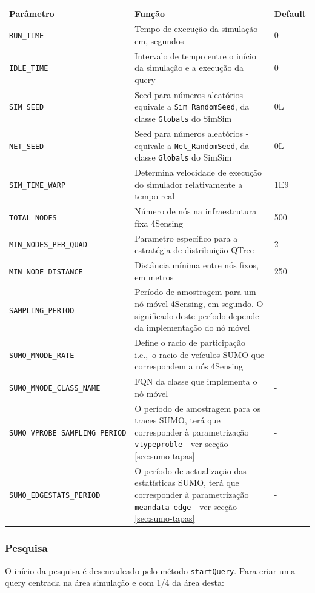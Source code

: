 \documentclass{article}
\newcommand{\ie}{i.e.,\ }
\newcommand{\tm}[1]{\texttt{#1}}
\begin{document}
\begin{tabular}{| l | p{} | l | }
\hline
Parâmetro & Função & Default\\
\hline
\tm{RUN\_TIME} & Tempo de execução da simulação em, segundos & 0 \\ \hline
\tm{IDLE\_TIME} & Intervalo de tempo entre o início da simulação e a execução da query & 0 \\ \hline
\tm{SIM\_SEED} & Seed para números aleatórios - equivale a \tm{Sim\_RandomSeed}, da classe \tm{Globals} do SimSim & 0L \\ \hline
\tm{NET\_SEED} & Seed para números aleatórios - equivale a \tm{Net\_RandomSeed}, da classe \tm{Globals}  do SimSim & 0L \\ \hline
\tm{SIM\_TIME\_WARP} & Determina velocidade de execução do simulador relativamente a tempo real   & 1E9 \\ \hline
\tm{TOTAL\_NODES} & Número de nós na infraestrutura fixa 4Sensing & 500 \\ \hline
\tm{MIN\_NODES\_PER\_QUAD} & Parametro específico para a estratégia de distribuição QTree & 2 \\ \hline
\tm{MIN\_NODE\_DISTANCE} & Distância mínima entre nós fixos, em metros & 250 \\ \hline
\tm{SAMPLING\_PERIOD} & Período de amostragem para um nó móvel 4Sensing, em segundo. O significado deste período depende da implementação do nó móvel & - \\ \hline
\tm{SUMO\_MNODE\_RATE} & Define o racio de participação \ie o racio de veículos SUMO que correspondem a nós 4Sensing & - \\ \hline
\tm{SUMO\_MNODE\_CLASS\_NAME} & FQN da classe que implementa o nó móvel & - \\ \hline
\tm{SUMO\_VPROBE\_SAMPLING\_PERIOD} & O período de amostragem para os traces SUMO, terá que corresponder à parametrização \tm{vtypeproble} - ver secção \ref{sec:sumo-tapas} & - \\ \hline
\tm{SUMO\_EDGESTATS\_PERIOD} & O período de actualização das estatísticas SUMO, terá que corresponder à parametrização \tm{meandata-edge} - ver secção \ref{sec:sumo-tapas} & - \\ \hline
\end{tabular}


\subsubsection{Pesquisa}
O início da pesquisa é desencadeado pelo método  \tm{startQuery}. Para criar uma query centrada na área simulação e com 1/4 da área desta:
\end{document}
